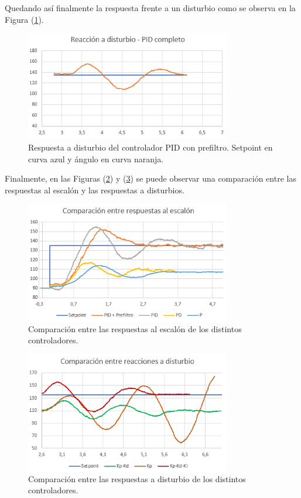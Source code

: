 Quedando así finalmente la respuesta frente a un disturbio como se observa en la Figura (\ref{fig:piddist}).

\begin{figure}[H]
    \centering
    \includegraphics[width=0.8\textwidth]{./Imagenes/piddist.png}
    \caption{Respuesta a disturbio del controlador PID con prefiltro. Setpoint en curva azul y ángulo en curva naranja.}
    \label{fig:piddist}
\end{figure}

Finalmente, en las Figuras (\ref{fig:comptrans}) y (\ref{fig:compdist}) se puede observar una comparación entre las respuestas al escalón y las respuestas a disturbios.

\begin{figure}[H]
    \centering
    \includegraphics[width=0.8\textwidth]{./Imagenes/comptrans.png}
    \caption{Comparación entre las respuestas al escalón de los distintos controladores.}
    \label{fig:comptrans}
\end{figure}

\begin{figure}[H]
    \centering
    \includegraphics[width=0.8\textwidth]{./Imagenes/compdist.png}
    \caption{Comparación entre las respuestas a disturbio de los distintos controladores.}
    \label{fig:compdist}
\end{figure}

